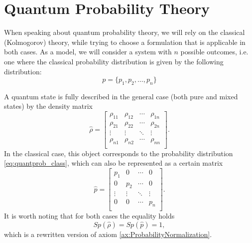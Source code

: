 \section{Quantum Probability Theory}
\label{sec:add:quantprobability}
When speaking about quantum probability theory, we will rely on the classical
(Kolmogorov) theory, while trying to choose a formulation
that is applicable in both cases. As a
model, we will consider a system with $n$ possible outcomes, i.e.
one where the classical probability distribution is given by
the following distribution:
\begin{equation}
p = \{p_1, p_2, \dots, p_n\}
\label{eq:quantprob_class}
\end{equation}

A quantum state is fully described in the general case (both pure
and mixed states) by the density matrix
\begin{equation}
\hat{\rho} = \begin{bmatrix}
\rho_{11} & \rho_{12} & \cdots & \rho_{1n} \\
\rho_{21} & \rho_{22} & \cdots & \rho_{2n} \\
\vdots & \vdots & \ddots & \vdots \\
\rho_{n1} & \rho_{n2} & \cdots & \rho_{nn} \\
\end{bmatrix}.
\nonumber
\end{equation}
In the classical case, this object corresponds
to the probability distribution \eqref{eq:quantprob_class}, which
can also be represented as a certain matrix
\begin{equation}
\hat{p} = \begin{bmatrix}
p_1 & 0 & \cdots & 0 \\
0 & p_2 & \cdots & 0 \\
\vdots & \vdots & \ddots & \vdots \\
0 & 0 & \cdots & p_n \\
\end{bmatrix}.
\nonumber
\end{equation}
It is worth noting that for both cases the equality holds
\[
Sp\left(\hat{\rho}\right) =
Sp\left(\hat{p}\right) = 1,
\]
which is a rewritten version of axiom
\ref{ax:ProbabilityNormalization}. 

